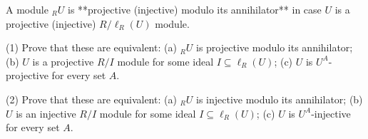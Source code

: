A module ${}_R U$ is **projective (injective) modulo its annihilator** in case $U$ is a projective (injective) $R/\ell_R(U)$ module.

(1) Prove that these are equivalent:
(a) ${}_R U$ is projective modulo its annihilator;
(b) $U$ is a projective $R/I$ module for some ideal $I \subseteq \ell_R(U)$;
(c) $U$ is $U^A$-projective for every set $A$.

(2) Prove that these are equivalent:
(a) ${}_R U$ is injective modulo its annihilator;
(b) $U$ is an injective $R/I$ module for some ideal $I \subseteq \ell_R(U)$;
(c) $U$ is $U^A$-injective for every set $A$.
